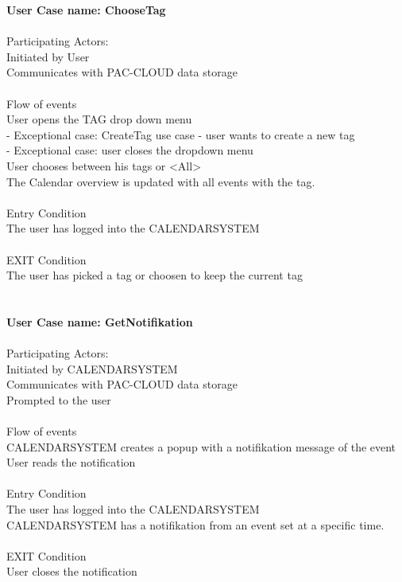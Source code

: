 \textbf{User Case name: ChooseTag}\\
\HRule \\[0.4cm]
Participating Actors:\\
Initiated by User\\
Communicates with PAC-CLOUD data storage\\
\HRule \\[0.4cm]
Flow of events\\
User opens the TAG drop down menu\\
 - Exceptional case: CreateTag use case - user wants to create a new tag\\
 - Exceptional case: user closes the dropdown menu\\
User chooses between his tags or <All>\\
The Calendar overview is updated with all events with the tag.\\
\HRule \\[0.4cm]
Entry Condition\\
The user has logged into the CALENDARSYSTEM\\
\HRule \\[0.4cm]
EXIT Condition\\
The user has picked a tag or choosen to keep the current tag\\\\\\
\textbf{User Case name: GetNotifikation}\\
\HRule \\[0.4cm]
Participating Actors:\\
Initiated by CALENDARSYSTEM\\
Communicates with PAC-CLOUD data storage\\
Prompted to the user\\
\HRule \\[0.4cm]
Flow of events\\
CALENDARSYSTEM creates a popup with a notifikation message of the event\\
User reads the notification\\
\HRule \\[0.4cm]
Entry Condition\\
The user has logged into the CALENDARSYSTEM\\
CALENDARSYSTEM has a notifikation from an event set at a specific time.\\
\HRule \\[0.4cm]
EXIT Condition\\
User closes the notification\\

\newpage